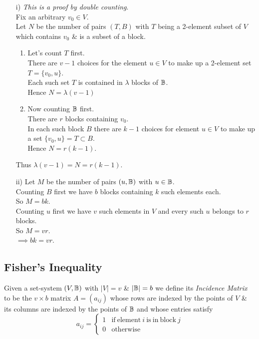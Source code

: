\documentclass[11pt,a4paper]{article}
\begin{document}
\begin{itemize}
	\item[i)]
	\textit{This is a proof by double counting}.\\
	Fix an arbitrary $v_0\in V$.\\
	Let $N$ be the number of pairs $(T,B)$ with $T$ being a 2-element subset of $V$ which contains $v_0$ \& is a subset of a block.
	\begin{enumerate}
		\item Let's count $T$ first.\\
		There are $v-1$ choices for the element $u\in V$ to make up a 2-element set $T=\{v_0,u\}$.\\
		Each such set $T$ is contained in $\lambda$ blocks of $\mathbb{B}$.\\
		Hence $N=\lambda(v-1)$
		\item Now counting $\mathbb{B}$ first.\\
		There are $r$ blocks containing $v_0$.\\
		In each such block $B$ there are $k-1$ choices for element $u\in V$ to make up a set $\{v_0,u\}=T\subset B$.\\
		Hence $N=r(k-1)$.
	\end{enumerate}
	Thus $\lambda(v-1)=N=r(k-1)$.
	\item[ii)] Let $M$ be the number of pairs $(u,\mathbb{B})$ with $u\in\mathbb{B}$.\\
	Counting $B$ first we have $b$ blocks containing $k$ such elements each.\\
	So $M=bk$.\\
	Counting $u$ first we have $v$ such elements in $V$ and every such $u$ belongs to $r$ blocks.\\
	So $M=vr$.\\
	$\implies bk=vr$.
\end{itemize}

\subsection{Fisher's Inequality}

Given a set-system $(V,\mathbb{B})$ with $|V|=v$ \& $|\mathbb{B}|=b$ we define its \textit{Incidence Matrix} to be the $v\times b$ matrix $A=(a_{ij})$ whose rows are indexed by the points of $V$ \& its columns are indexed by the points of $\mathbb{B}$ and whose entries satisfy
$$a_{ij}=\begin{cases}1&\mathrm{if\ element\ } i \mathrm{\ is\ in\ block\ }j\\0&\mathrm{otherwise}\end{cases}$$
\end{document}
